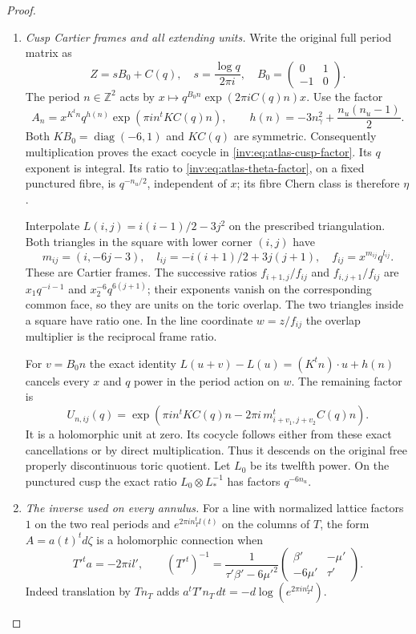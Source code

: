 \begin{proof}
\begin{enumerate}[label=\arabic*.,leftmargin=*]
\item \emph{Cusp Cartier frames and all extending units.}
Write the original full period matrix as
\[
 Z=sB_0+C(q),\quad s=\frac{\log q}{2\pi i},\quad
 B_0=\begin{pmatrix}0&1\\-1&0\end{pmatrix}.
\]
The period $n\in\mathbb Z^2$ acts by
$x\mapsto q^{B_0n}\exp(2\pi iC(q)n)x$.
Use the factor
\begin{equation}\label{inv:eq:atlas-cusp-factor}
 A_n=x^{K^tn}q^{h(n)}\exp(\pi i n^tKC(q)n),
 \qquad h(n)=-3n_\gamma^2+\frac{n_u(n_u-1)}2.
\end{equation}
Both $KB_0=\operatorname{diag}(-6,1)$ and $KC(q)$ are symmetric.
Consequently multiplication proves the exact cocycle in
\eqref{inv:eq:atlas-cusp-factor}.  Its $q$ exponent is integral.
Its ratio to \eqref{inv:eq:atlas-theta-factor}, on a fixed punctured
fibre, is $q^{-n_u/2}$, independent of $x$; its fibre Chern class
is therefore $\eta$.

Interpolate $L(i,j)=i(i-1)/2-3j^2$ on the prescribed triangulation.
Both triangles in the square with lower corner $(i,j)$ have
\[
 m_{ij}=(i,-6j-3),\quad
 l_{ij}=-i(i+1)/2+3j(j+1),\quad f_{ij}=x^{m_{ij}}q^{l_{ij}}.
\]
These are Cartier frames.  The successive ratios $f_{i+1,j}/f_{ij}$
and $f_{i,j+1}/f_{ij}$ are $x_1q^{-i-1}$ and
$x_2^{-6}q^{6(j+1)}$; their exponents vanish on the corresponding
common face, so they are units on the toric overlap.  The two triangles
inside a square have ratio one.  In the line coordinate $w=z/f_{ij}$
the overlap multiplier is the reciprocal frame ratio.

For $v=B_0n$ the exact identity
$L(u+v)-L(u)=(K^tn)\cdot u+h(n)$ cancels every $x$ and $q$ power
in the period action on $w$.  The remaining factor is
\begin{equation}\label{inv:eq:atlas-cusp-unit}
 U_{n,ij}(q)=\exp\left(\pi i n^tKC(q)n
       -2\pi i\,m_{i+v_1,j+v_2}^{t}C(q)n\right).
\end{equation}
It is a holomorphic unit at zero.  Its cocycle follows either from
these exact cancellations or by direct multiplication.  Thus it
descends on the original free properly discontinuous toric quotient.
Let $L_0$ be its twelfth power.  On the punctured cusp the exact
ratio $L_0\otimes L_*^{-1}$ has factors $q^{-6n_u}$.

\item \emph{The inverse used on every annulus.}
For a line with normalized lattice factors $1$ on the two real
periods and $e^{2\pi i n_T^tl(t)}$ on the columns of $T$, the form
$A=a(t)^t d\zeta$ is a holomorphic connection when
\begin{equation}\label{inv:eq:atlas-connection-inverse}
 T'^t a=-2\pi i l',\qquad
 (T'^t)^{-1}=
 \frac1{\tau'\beta'-6\mu'^2}
 \begin{pmatrix}\beta'&-\mu'\\-6\mu'&\tau'\end{pmatrix}.
\end{equation}
Indeed translation by $Tn_T$ adds
$a^tT'n_T\,dt=-d\log(e^{2\pi in_T^tl})$.


\end{enumerate}
\end{proof}
